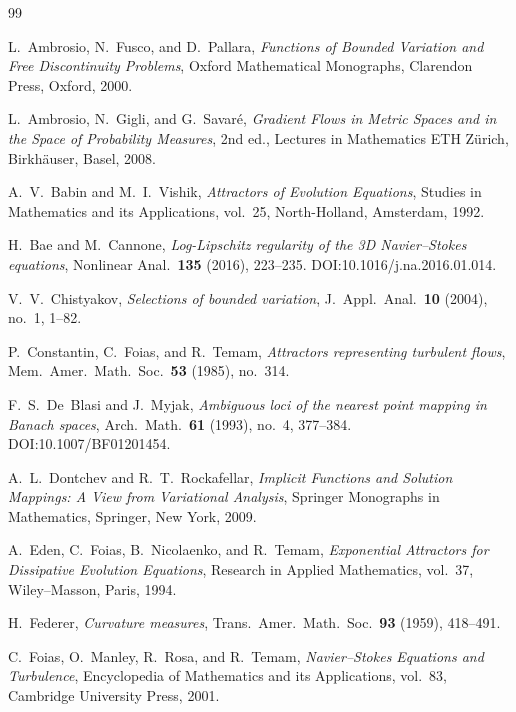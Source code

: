 \documentclass[12pt,a4paper]{article}
\theoremstyle{definition}
\theoremstyle{plain}
\theoremstyle{remark}
\begin{document}
\begin{thebibliography}{99}
\small
\sloppy
\setlength{\itemsep}{0.1\baselineskip}
\setlength{\parskip}{0pt}

L.~Ambrosio, N.~Fusco, and D.~Pallara,
\emph{Functions of Bounded Variation and Free Discontinuity Problems},
Oxford Mathematical Monographs, Clarendon Press, Oxford, 2000.

L.~Ambrosio, N.~Gigli, and G.~Savaré,
\emph{Gradient Flows in Metric Spaces and in the Space of
Probability Measures},
2nd ed., Lectures in Mathematics ETH Zürich,
Birkhäuser, Basel, 2008.

A.~V.~Babin and M.~I.~Vishik,
\emph{Attractors of Evolution Equations},
Studies in Mathematics and its Applications, vol.~25,
North-Holland, Amsterdam, 1992.

H.~Bae and M.~Cannone,
\emph{Log-Lipschitz regularity of the 3D Navier--Stokes equations},
Nonlinear Anal.\ \textbf{135} (2016), 223--235.
DOI:\@ 10.1016/j.na.2016.01.014.

V.~V.~Chistyakov,
\emph{Selections of bounded variation},
J.~Appl.\ Anal.\ \textbf{10} (2004), no.~1, 1--82.

P.~Constantin, C.~Foias, and R.~Temam,
\emph{Attractors representing turbulent flows},
Mem.\ Amer.\ Math.\ Soc.\ \textbf{53} (1985), no.~314.

F.~S.~De~Blasi and J.~Myjak,
\emph{Ambiguous loci of the nearest point mapping in Banach spaces},
Arch.\ Math.\ \textbf{61} (1993), no.~4, 377--384.
DOI:\@ 10.1007/BF01201454.

A.~L.~Dontchev and R.~T.~Rockafellar,
\emph{Implicit Functions and Solution Mappings: A View from
Variational Analysis},
Springer Monographs in Mathematics, Springer, New York, 2009.

A.~Eden, C.~Foias, B.~Nicolaenko, and R.~Temam,
\emph{Exponential Attractors for Dissipative Evolution Equations},
Research in Applied Mathematics, vol.~37,
Wiley--Masson, Paris, 1994.

H.~Federer,
\emph{Curvature measures},
Trans.\ Amer.\ Math.\ Soc.\ \textbf{93} (1959), 418--491.

C.~Foias, O.~Manley, R.~Rosa, and R.~Temam,
\emph{Navier--Stokes Equations and Turbulence},
Encyclopedia of Mathematics and its Applications, vol.~83,
Cambridge University Press, 2001.


\end{thebibliography}
\end{document}
